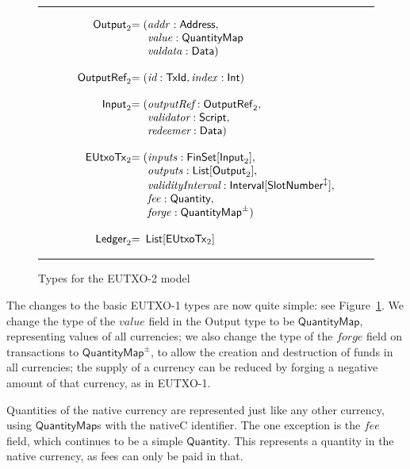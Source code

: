 \documentclass[a4paper]{article}
\renewcommand{\i}{\textit}  %
\newcommand{\s}{\textsf}  %
\newenvironment{arraydefs}[1]{\setlength{\arraycolsep}{0pt}\begin{array}{#1}}{\end{array}}
\newcommand\rfskip{7pt}
\newenvironment{ruledfigure}[1]{\begin{figure}[#1]\hrule\vspace{\rfskip}}{\vspace{\rfskip}\hrule\end{figure}}
\newcommand{\List}[1]{\ensuremath{\s{List}[#1]}}
\newcommand{\FinSet}[1]{\ensuremath{\s{FinSet}[#1]}}
\newcommand{\Interval}[1]{\ensuremath{\s{Interval}[#1]}}
\newcommand{\extended}[1]{#1^\updownarrow}
\newcommand{\script}{\ensuremath{\s{Script}}}
\newcommand{\mi}[1]{\ensuremath{\mathit{#1}}}
\newcommand{\idx}{\mi{index}}
\newcommand{\inputs}{\mi{inputs}}
\newcommand{\outputs}{\mi{outputs}}
\newcommand{\forge}{\mi{forge}}
\newcommand{\fee}{\mi{fee}}
\newcommand{\addr}{\mi{addr}}
\newcommand{\val}{\mi{value}}  %
\newcommand{\valdata}{\mi{valdata}}
\newcommand{\Data}{\ensuremath{\mathsf{Data}}}
\newcommand{\msf}[1]{\ensuremath{\mathsf{#1}}}
\newcommand{\slotnum}{\msf{SlotNumber}}
\newcommand{\eutxotx}{\msf{EUtxoTx}}
\newcommand{\qty}{\ensuremath{\s{Quantity}}}
\newcommand{\nativeCur}{\ensuremath{\mathrm{nativeC}}}
\newcommand{\qtymap}{\ensuremath{\s{QuantityMap}}}
\newcommand{\qtymappm}{\ensuremath{\s{QuantityMap}^{\pm}}}
\begin{document}
\begin{ruledfigure}{H}
  \[
  \begin{arraydefs}{rll}
    \s{Output}_2 &= (&\addr: \s{Address},\\
    && \val: \qtymap\\
    && \valdata: \Data)\\
    \\
    \s{OutputRef}_2 &= (&\i{id}: \s{TxId}, \idx: \s{Int})\\
    \\
    \s{Input}_2 &= (& \i{outputRef}: \sf{OutputRef}_2,\\
                     && \i{validator}: \script,\\
                     & & \i{redeemer}: \Data)\\
    \\
    \eutxotx_2 &= ( &\inputs: \FinSet{\s{Input}_2},\\
    &&\outputs: \List{\s{Output}_2},\\
    &&\i{validityInterval}: \Interval{\extended{\slotnum}},\\
    &&\fee: \qty,\\
    &&\forge: \qtymap^{\pm})\\
    \\
    \s{Ledger}_2 &=&\!\List{\eutxotx_2}\\
\end{arraydefs}
  \]
  \caption{Types for the EUTXO-2 model}
  \label{fig:eutxo-2-types}
\end{ruledfigure}

\noindent The changes to the basic EUTXO-1 types are now quite simple:
see Figure~\ref{fig:eutxo-2-types}.  We change the type of the $\val$ field
in the \s{Output} type to be \qtymap{}, representing values of all currencies;
we also change the type of the \forge{} field on transactions to \qtymappm{}, to
allow the creation and destruction of funds in all currencies; the
supply of a currency can be reduced by forging a negative amount of that
currency, as in EUTXO-1.

Quantities of the native currency are represented just like any other currency,
using \qtymap{}s with the \nativeCur{} identifier. The one exception is the
\fee{} field, which continues to be a simple \qty{}. This represents a quantity
in the native currency, as fees can only be paid in that.
\end{document}
